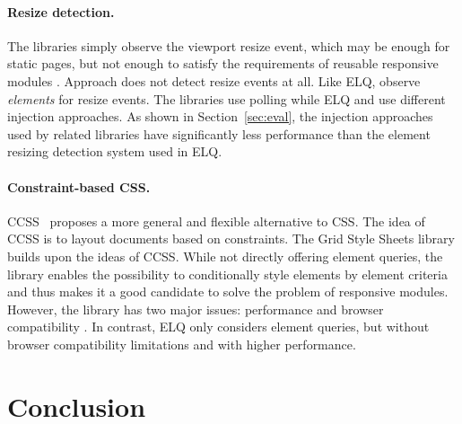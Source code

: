 \documentclass[sigconf,9pt]{acmart}
\newcommand{\elq}{ELQ}
\begin{document}
  \paragraph{Resize detection.}
  The libraries \cite{eq_imp_eqcss,eq_imp_breakpointsjs,eq_imp_mediaclass,eq_imp_elementquery,eq_imp_responsive-elements,eq_imp_sickles,eq_imp_responsive-elements-2,eq_imp_breaks2000,eq_imp_eqjs} simply observe the viewport resize event, which may be enough for static pages, but not enough to satisfy the requirements of reusable responsive modules \cite{elq-thesis}.
  Approach \cite{eq_imp_classquery} does not detect resize events at all.
  Like \elq{}, \cite{eq_imp_localised-css,eq_imp_selector_queries,eq_imp_prollyfill-min-width,eq_imp_gss,eq_imp_element-queries,eq_imp_css-element-queries} observe \emph{elements} for resize events.
  The libraries \cite{eq_imp_localised-css,eq_imp_selector_queries} use polling while \elq{} and \cite{eq_imp_prollyfill-min-width,eq_imp_gss,eq_imp_element-queries,eq_imp_css-element-queries} use different injection approaches.
  As shown in Section~\ref{sec:eval}, the injection approaches used by related libraries have significantly less performance than the element resizing detection system used in \elq{}.

  \paragraph{Constraint-based CSS.}
  CCSS~\cite{badros1999constraint} proposes a more general and flexible alternative to CSS.
  The idea of CCSS is to layout documents based on constraints.
  The Grid Style Sheets library \cite{eq_imp_gss} builds upon the ideas of CCSS.
  While not directly offering element queries, the library enables the possibility to conditionally style elements by element criteria and thus makes it a good candidate to solve the problem of responsive modules.
  However, the library has two major issues: performance and browser compatibility \cite{gss_issue}.
  In contrast, \elq{} only considers element queries, but without browser compatibility limitations and with higher performance.

  \section{Conclusion}\label{sec:conclusion}
\end{document}
